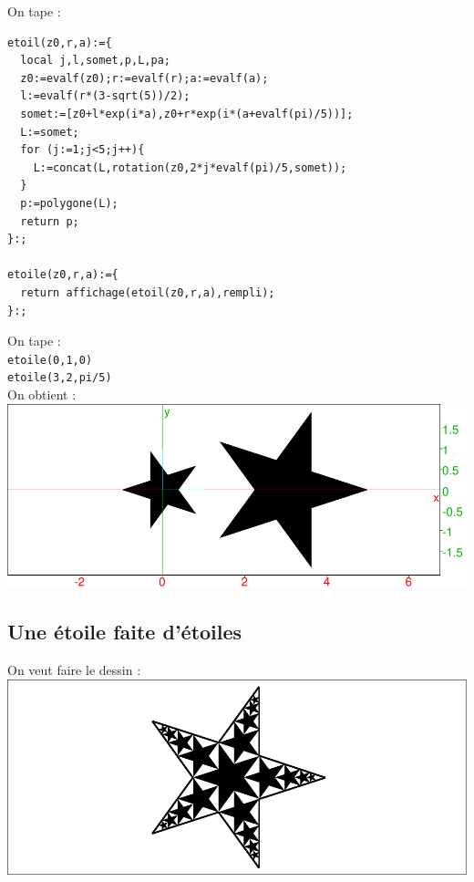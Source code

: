 \documentclass[a4paper,11pt]{book}
\begin{document}
On tape :
\begin{verbatim}
etoil(z0,r,a):={
  local j,l,somet,p,L,pa;
  z0:=evalf(z0);r:=evalf(r);a:=evalf(a);
  l:=evalf(r*(3-sqrt(5))/2);
  somet:=[z0+l*exp(i*a),z0+r*exp(i*(a+evalf(pi)/5))];
  L:=somet;
  for (j:=1;j<5;j++){
    L:=concat(L,rotation(z0,2*j*evalf(pi)/5,somet));
  }
  p:=polygone(L);
  return p;
}:;

etoile(z0,r,a):={
  return affichage(etoil(z0,r,a),rempli);
}:;
\end{verbatim}
On tape :\\
{\tt etoile(0,1,0)}\\
{\tt etoile(3,2,pi/5)}\\
On obtient :\\

\includegraphics[width=\textwidth]{etoile}

\subsection{Une \'etoile faite d'\'etoiles}
On veut faire le dessin :\\

\includegraphics[width=\textwidth]{etoiles5}
\end{document}
